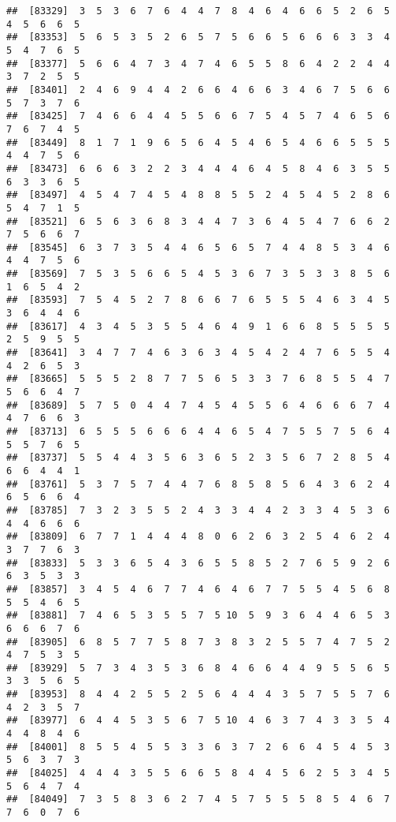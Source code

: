 \documentclass[
]{book}
\begin{document}
\begin{verbatim}
##  [83329]  3  5  3  6  7  6  4  4  7  8  4  6  4  6  6  5  2  6  5  4  5  6  6  5
##  [83353]  5  6  5  3  5  2  6  5  7  5  6  6  5  6  6  6  3  3  4  5  4  7  6  5
##  [83377]  5  6  6  4  7  3  4  7  4  6  5  5  8  6  4  2  2  4  4  3  7  2  5  5
##  [83401]  2  4  6  9  4  4  2  6  6  4  6  6  3  4  6  7  5  6  6  5  7  3  7  6
##  [83425]  7  4  6  6  4  4  5  5  6  6  7  5  4  5  7  4  6  5  6  7  6  7  4  5
##  [83449]  8  1  7  1  9  6  5  6  4  5  4  6  5  4  6  6  5  5  5  4  4  7  5  6
##  [83473]  6  6  6  3  2  2  3  4  4  4  6  4  5  8  4  6  3  5  5  6  3  3  6  5
##  [83497]  4  5  4  7  4  5  4  8  8  5  5  2  4  5  4  5  2  8  6  5  4  7  1  5
##  [83521]  6  5  6  3  6  8  3  4  4  7  3  6  4  5  4  7  6  6  2  7  5  6  6  7
##  [83545]  6  3  7  3  5  4  4  6  5  6  5  7  4  4  8  5  3  4  6  4  4  7  5  6
##  [83569]  7  5  3  5  6  6  5  4  5  3  6  7  3  5  3  3  8  5  6  1  6  5  4  2
##  [83593]  7  5  4  5  2  7  8  6  6  7  6  5  5  5  4  6  3  4  5  3  6  4  4  6
##  [83617]  4  3  4  5  3  5  5  4  6  4  9  1  6  6  8  5  5  5  5  2  5  9  5  5
##  [83641]  3  4  7  7  4  6  3  6  3  4  5  4  2  4  7  6  5  5  4  4  2  6  5  3
##  [83665]  5  5  5  2  8  7  7  5  6  5  3  3  7  6  8  5  5  4  7  5  6  6  4  7
##  [83689]  5  7  5  0  4  4  7  4  5  4  5  5  6  4  6  6  6  7  4  4  7  6  6  3
##  [83713]  6  5  5  5  6  6  6  4  4  6  5  4  7  5  5  7  5  6  4  5  5  7  6  5
##  [83737]  5  5  4  4  3  5  6  3  6  5  2  3  5  6  7  2  8  5  4  6  6  4  4  1
##  [83761]  5  3  7  5  7  4  4  7  6  8  5  8  5  6  4  3  6  2  4  6  5  6  6  4
##  [83785]  7  3  2  3  5  5  2  4  3  3  4  4  2  3  3  4  5  3  6  4  4  6  6  6
##  [83809]  6  7  7  1  4  4  4  8  0  6  2  6  3  2  5  4  6  2  4  3  7  7  6  3
##  [83833]  5  3  3  6  5  4  3  6  5  5  8  5  2  7  6  5  9  2  6  6  3  5  3  3
##  [83857]  3  4  5  4  6  7  7  4  6  4  6  7  7  5  5  4  5  6  8  5  5  4  6  5
##  [83881]  7  4  6  5  3  5  5  7  5 10  5  9  3  6  4  4  6  5  3  6  6  6  7  6
##  [83905]  6  8  5  7  7  5  8  7  3  8  3  2  5  5  7  4  7  5  2  4  7  5  3  5
##  [83929]  5  7  3  4  3  5  3  6  8  4  6  6  4  4  9  5  5  6  5  3  3  5  6  5
##  [83953]  8  4  4  2  5  5  2  5  6  4  4  4  3  5  7  5  5  7  6  4  2  3  5  7
##  [83977]  6  4  4  5  3  5  6  7  5 10  4  6  3  7  4  3  3  5  4  4  4  8  4  6
##  [84001]  8  5  5  4  5  5  3  3  6  3  7  2  6  6  4  5  4  5  3  5  6  3  7  3
##  [84025]  4  4  4  3  5  5  6  6  5  8  4  4  5  6  2  5  3  4  5  5  6  4  7  4
##  [84049]  7  3  5  8  3  6  2  7  4  5  7  5  5  5  8  5  4  6  7  7  6  0  7  6

\end{verbatim}
\end{document}

